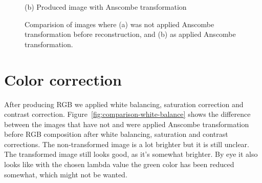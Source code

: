 \documentclass[12pt,a4paper,english
]{tunithesis}
\begin{document}
\begin{figure}[h]
\begin{minipage}[b]{0.45\textwidth}
    \caption*{(b) Produced image with Anscombe transformation}
  \end{minipage}
  \caption{Comparision of images where (a) was not applied Anscombe transformation before reconstruction, and (b) as applied Anscombe transformation.}
  \label{fig:comparison-dct}
\end{figure}

\section{Color correction}
After producing RGB we applied white balancing, saturation correction and contrast correction. Figure~\ref{fig:comparison-white-balance} shows the difference between the images that have not and were applied Anscombe transformation before RGB composition after white balancing, saturation and contrast corrections. The non-transformed image is a lot brighter but it is still unclear. The transformed image still looks good, as it's somewhat brighter. By eye it also looks like with the chosen lambda value the green color has been reduced somewhat, which might not be wanted.
\end{document}

